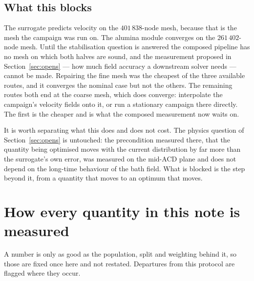 \documentclass[11pt,a4paper]{article}
\theoremstyle{plain}
\theoremstyle{definition}
\theoremstyle{remark}
\begin{document}
\subsection{What this blocks}

The surrogate predicts velocity on the $401\,838$-node mesh, because that is the
mesh the campaign was run on. The alumina module converges on the $261\,402$-node
mesh. Until the stabilisation question is answered the composed pipeline has no
mesh on which both halves are sound, and the measurement proposed in
Section~\ref{sec:opens} --- how much field accuracy a downstream solver needs ---
cannot be made. Repairing the fine mesh was the cheapest of the three available routes, and it
converges the nominal case but not the others. The remaining routes both end at
the coarse mesh, which does converge: interpolate the campaign's velocity fields
onto it, or run a stationary campaign there directly. The first is the cheaper
and is what the composed measurement now waits on.

It is worth separating what this does and does not cost. The physics question of
Section~\ref{sec:opens} is untouched: the precondition measured there, that the
quantity being optimised moves with the current distribution by far more than the
surrogate's own error, was measured on the mid-ACD plane and does not depend on
the long-time behaviour of the bath field. What is blocked is the step beyond it,
from a quantity that moves to an optimum that moves.

\appendix
\section{How every quantity in this note is measured}
\label{app:protocol}

A number is only as good as the population, split and weighting behind it, so
those are fixed once here and not restated. Departures from this protocol are
flagged where they occur.
\end{document}
